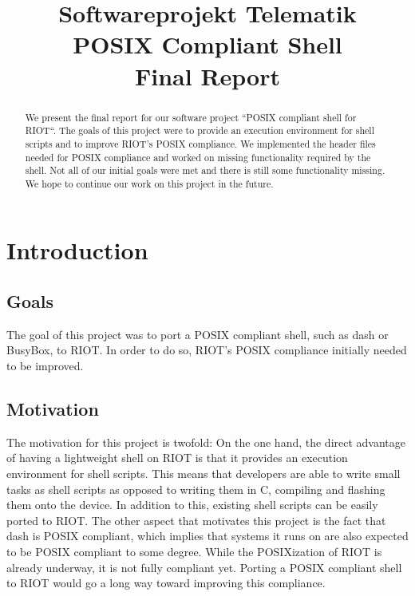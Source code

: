 \documentclass[conference]{IEEEtran}
\begin{document}
\title{Softwareprojekt Telematik\\POSIX Compliant Shell\\Final Report}


\author{
\and
{}
\and
{}
}

\maketitle


\begin{abstract}
  We present the final report for our software project ``POSIX compliant
  shell for RIOT``. The goals of this project were to provide an
  execution environment for shell scripts and to improve RIOT's POSIX
  compliance. We implemented the header files needed for POSIX
  compliance and worked on missing functionality required by the shell.
  Not all of our initial goals were met and there is still some
  functionality missing. We hope to continue our work on this project in
  the future.
\end{abstract}

\section{Introduction}
\label{sec:Introduction}

\subsection{Goals}
\label{sub:Goals}
The goal of this project was to port a POSIX compliant shell, such as
dash\cite{dash} or BusyBox\cite{busybox}, to RIOT. In order to do so,
RIOT's POSIX compliance initially needed to be improved.

\subsection{Motivation}
\label{sub:Motivation}
The motivation for this project is twofold: On the one hand, the direct
advantage of having a lightweight shell on RIOT is that it provides an
execution environment for shell scripts. This means that developers are
able to write small tasks as shell scripts as opposed to writing them in
C, compiling and flashing them onto the device. In addition to this,
existing shell scripts can be easily ported to RIOT. The other aspect
that motivates this project is the fact that dash is POSIX compliant,
which implies that systems it runs on are also expected to be POSIX
compliant to some degree. While the POSIXization of RIOT is already
underway, it is not fully compliant yet. Porting a POSIX compliant shell
to RIOT would go a long way toward improving this compliance.
\end{document}
